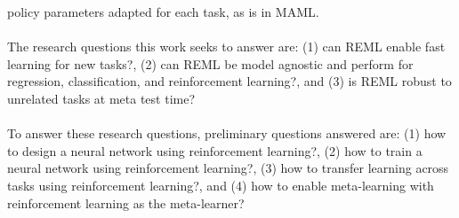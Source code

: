 policy parameters adapted for each task, as is in MAML.
\\\\
The research questions this work seeks to answer are: (1) can REML enable fast 
learning for new tasks?, (2) can REML be model agnostic and perform for 
regression, classification, and reinforcement learning?, and (3) is REML robust to 
unrelated tasks at meta test time?
\\\\
To answer these research questions, preliminary questions answered are: (1) how to 
design a neural network using reinforcement learning?, (2) how to train a neural 
network using reinforcement learning?, (3) how to transfer learning across tasks 
using reinforcement learning?, and (4) how to enable meta-learning with 
reinforcement learning as the meta-learner?